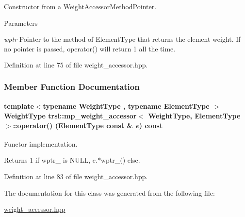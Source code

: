 Constructor from a WeightAccessorMethodPointer. 
\begin{DoxyParams}{Parameters}
\item[{\em wptr}]Pointer to the method of ElementType that returns the element weight. If no pointer is passed, operator() will return 1 all the time. \end{DoxyParams}


Definition at line 75 of file weight\_\-accessor.hpp.

\subsubsection{Member Function Documentation}
\hypertarget{classtrsl_1_1mp__weight__accessor_aff20477c2a3c98508fe2f26effb49000}{
\paragraph[{operator()}]{\setlength{\rightskip}{0pt plus 5cm}template$<$typename WeightType , typename ElementType $>$ WeightType {\bf trsl::mp\_\-weight\_\-accessor}$<$ WeightType, ElementType $>$::operator() (ElementType const \& {\em e}) const}\hfill}
\label{classtrsl_1_1mp__weight__accessor_aff20477c2a3c98508fe2f26effb49000}


Functor implementation. \begin{DoxyReturn}{Returns}
1 if wptr\_\- is NULL, {\ttfamily e.$\ast$wptr\_\-()} else. 
\end{DoxyReturn}


Definition at line 83 of file weight\_\-accessor.hpp.

The documentation for this class was generated from the following file:\begin{DoxyCompactItemize}
\item 
\hyperlink{weight__accessor_8hpp}{weight\_\-accessor.hpp}\end{DoxyCompactItemize}
